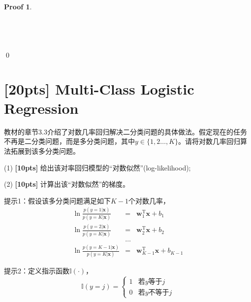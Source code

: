 \documentclass[a4paper,UTF8]{article}
\numberwithin{equation}{section}
\theoremstyle{definition}
\newtheorem*{prove}{Proof}
\begin{document}
\begin{prove}


~\\
~\\
~\\
~\\
~\\
\qed
\end{prove}

\section{[20pts] Multi-Class Logistic Regression}
教材的章节3.3介绍了对数几率回归解决二分类问题的具体做法。假定现在的任务不再是二分类问题，而是多分类问题，其中$y\in\{1,2\dots,K\}$。请将对数几率回归算法拓展到该多分类问题。

(1) \textbf{[10pts]} 给出该对率回归模型的“对数似然”(log-likelihood);

(2) \textbf{[10pts]} 计算出该“对数似然”的梯度。

提示1：假设该多分类问题满足如下$K-1$个对数几率，
\begin{eqnarray*}
\ln\frac{p(y=1|\mathbf{x})}{p(y=K|\mathbf{x})}&=&\mathbf{w}_1^\mathrm{T}\mathbf{x}+b_1\\
\ln\frac{p(y=2|\mathbf{x})}{p(y=K|\mathbf{x})}&=&\mathbf{w}_2^\mathrm{T}\mathbf{x}+b_2\\
&\dots&\\
\ln\frac{p(y={K-1}|\mathbf{x})}{p(y=K|\mathbf{x})}&=&\mathbf{w}_{K-1}^\mathrm{T}\mathbf{x}+b_{K-1}
\end{eqnarray*}

提示2：定义指示函数$\mathbb{I}(\cdot)$，
$$\mathbb{I}(y=j)=
\begin{cases}
1& \text{若$y$等于$j$}\\
0& \text{若$y$不等于$j$}
\end{cases}$$
\end{document}
